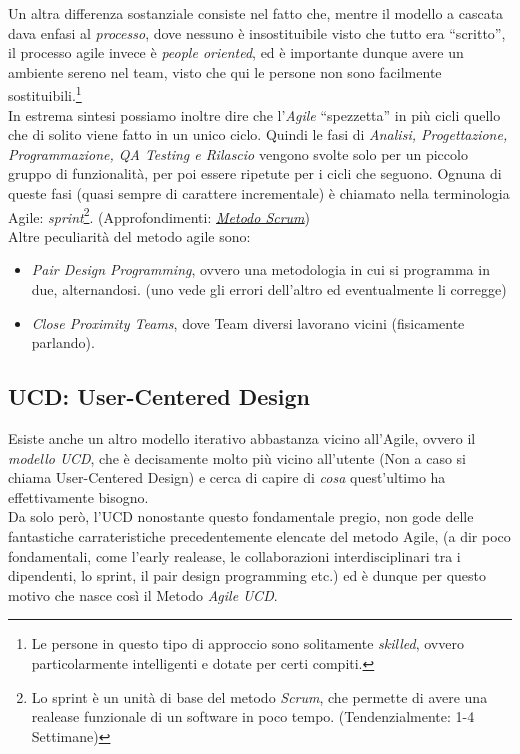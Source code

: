 \documentclass[oneside]{book}
\begin{document}
		Un altra differenza sostanziale consiste nel fatto che, mentre il modello a cascata dava enfasi al \emph{processo}, dove nessuno è insostituibile visto che tutto era ``scritto'', il processo agile invece è \emph{people oriented}, ed è importante dunque avere un ambiente sereno nel team, visto che qui le persone non sono facilmente sostituibili.\footnote{ Le persone in questo tipo di approccio sono solitamente \emph{skilled}, ovvero particolarmente intelligenti e dotate per certi compiti.} \\

		In estrema sintesi possiamo inoltre dire che l'\emph{Agile} ``spezzetta'' in più cicli quello che di solito viene fatto in un unico ciclo. Quindi le fasi di \emph{Analisi, Progettazione, Programmazione, QA Testing e Rilascio} vengono svolte solo per un piccolo gruppo di funzionalità, per poi essere ripetute per i cicli che seguono. Ognuna di queste fasi (quasi sempre di carattere incrementale) è chiamato nella terminologia Agile: \emph{sprint}\footnote{ Lo sprint è un unità di base del metodo \emph{Scrum}, che permette di avere una realease funzionale di un software in poco tempo. (Tendenzialmente: 1-4 Settimane)}. (Approfondimenti: \href{https://it.wikipedia.org/wiki/Scrum_(informatica)#Sprint}{\emph{Metodo Scrum}})\\
		
		Altre peculiarità del metodo agile sono:
		\begin{itemize}
		\item \emph{Pair Design Programming}, ovvero una metodologia in cui si programma in due, alternandosi. (uno vede gli errori dell'altro ed eventualmente li corregge) 
		\item \emph{Close Proximity Teams}, dove Team diversi lavorano vicini (fisicamente parlando).
		\end{itemize}

		\subsection{UCD: User-Centered Design} \label{sec:UCD}
			Esiste anche un altro modello iterativo abbastanza vicino all'Agile, ovvero il \emph{modello UCD}, che è decisamente molto più vicino all'utente (Non a caso si chiama User-Centered Design) e cerca di capire di \emph{cosa} quest'ultimo ha effettivamente bisogno. \\
			Da solo però, l'UCD nonostante questo fondamentale pregio, non gode delle fantastiche carrateristiche precedentemente elencate del metodo Agile, (a dir poco fondamentali, come l'early realease, le collaborazioni interdisciplinari tra i dipendenti, lo sprint, il pair design programming etc.) ed è dunque per questo motivo che nasce così il Metodo \emph{Agile UCD}. \\
		
\end{document}

